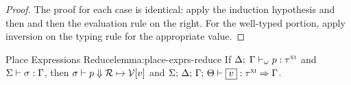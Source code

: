 \begin{proof}
  \vspace{1em}

  \noindent \framebox[\textwidth]{
    \figuresize
    \begin{mathpar}
      \WFRefSliceArray \and \ERSliceArray
    \end{mathpar}
  }

  \vspace{1em}

  \noindent \framebox[\textwidth]{
    \figuresize
    \begin{mathpar}
      \WFRefSliceSlice \and \ERSliceSlice
    \end{mathpar}
  }

  The proof for each case is identical: apply the induction hypothesis and then
   and then the evaluation rule on the right. For
  the well-typed portion, apply inversion on the typing rule for the appropriate
  value.
\end{proof}

\begin{oxlemma}{Place Expressions Reduce}{lemma:place-exprs-reduce}
  If $ \Delta; \; \Gamma \vdash_{\omega} p : \tau^\textsc{xi} $
  and $\Sigma \vdash \sigma : \Gamma$,
  then $ \sigma \vdash p \Downarrow \mathcal{R} \mapsto \mathcal{V} [v] $ and
  $\oxtypjudge{\oxglobalctx}{\oxtvarctx}{\oxkontctx}{\oxvarctx}{\oxvalue}{\oxxitype}{\oxvarctx}$.
\end{oxlemma}

